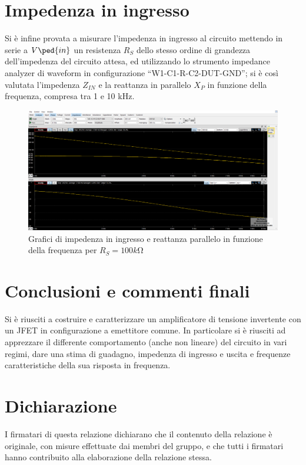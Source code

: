 \documentclass[10pt, a4paper, italian]{article}
\begin{document}
\section{Impedenza in ingresso}
Si è infine provata a misurare l'impedenza in ingresso al circuito mettendo in serie a $V\ped{in}$ un resistenza $R_S$ dello stesso ordine di grandezza dell'impedenza del circuito attesa, ed utilizzando lo strumento impedance analyzer di waveform in configurazione “W1-C1-R-C2-DUT-GND”; si è così valutata l'impedenza $Z_{IN}$ e la reattanza in parallelo $X_P$ in funzione della frequenza, compresa tra 1 e 10 kHz.
\begin{figure}[htbp]
    \centering
	\includegraphics[scale=0.4]{impedance}
    \caption{Grafici di impedenza in ingresso e reattanza parallelo in funzione della frequenza per $R_S=100 \si{k\ohm}$}
\end{figure}

\section*{Conclusioni e commenti finali}
Si è riusciti a costruire e caratterizzare un amplificatore di tensione
invertente con un JFET in configurazione a emettitore comune. In particolare
si è riusciti ad apprezzare il differente comportamento (anche non lineare)
del circuito in vari regimi, dare una stima di guadagno, impedenza di
ingresso e uscita e frequenze caratteristiche della sua risposta in frequenza.

\section*{Dichiarazione}
I firmatari di questa relazione dichiarano che il contenuto della relazione \`e
originale, con misure effettuate dai membri del gruppo, e che tutti i firmatari
hanno contribuito alla elaborazione della relazione stessa.
\end{document}
